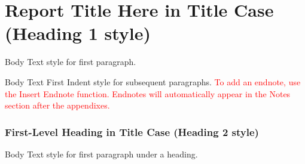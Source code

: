 
\fancyfoot{}




\part{Report Title Here in Title Case (Heading 1 style)}
Body Text style for first paragraph.

Body Text First Indent style for subsequent paragraphs. \textcolor{red}{To add an endnote, use the Insert Endnote function. Endnotes will automatically appear in the Notes section after the appendixes.} 

\section{First-Level Heading in Title Case (Heading 2 style)}

Body Text style for first paragraph under a heading.

